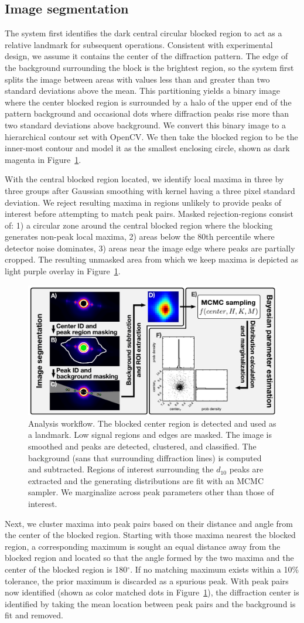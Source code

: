 \documentclass{sig-alternate}
\newcommand{\figureworkflow}{
\begin{figure}[tbp]
  \centering
  \includegraphics[width=\linewidth]{figures/img_analysis}
  \vspace{-8pt}
  \caption{\label{fig:workflow}
  	Analysis workflow.
    The blocked center region is detected and used as a landmark.  Low
    signal regions and edges are masked. The image is smoothed and
    peaks are detected, clustered, and classified. The background
    (sans that surrounding diffraction lines) is computed and
    subtracted. Regions of interest surrounding the $d_{10}$ peaks are
    extracted and the generating distributions are fit with an MCMC
    sampler. We marginalize across peak parameters other than those of
    interest.  
	}
	\vspace{-2pt}
\end{figure}
}
\begin{document}
\subsection{Image segmentation}

The system first identifies the dark central circular blocked region
to act as a relative landmark for subsequent operations. Consistent
with experimental design, we assume it contains the center of the
diffraction pattern. The edge of the background surrounding the block
is the brightest region, so the system first splits the image between
areas with values less than and greater than two standard deviations
above the mean. This partitioning yields a binary image where the
center blocked region is surrounded by a halo of the upper end of the
pattern background and occasional dots where diffraction peaks rise
more than two standard deviations above background. We convert this
binary image to a hierarchical contour set with OpenCV. We then take
the blocked region to be the inner-most contour and model it as the
smallest enclosing circle, shown as dark magenta in
Figure~\ref{fig:workflow}. 

With the central blocked region located, we identify local maxima in
three by three groups after Gaussian smoothing with kernel having a
three pixel standard deviation. We reject resulting maxima in regions
unlikely to provide peaks of interest before attempting to match peak
pairs. Masked rejection-regions consist of: 1) a circular zone around
the central blocked region where the blocking generates non-peak local
maxima, 2) areas below the 80th percentile where detector noise
dominates, 3) areas near the image edge where peaks are partially
cropped. The resulting unmasked area from which we keep maxima is
depicted as light purple overlay in Figure~\ref{fig:workflow}.

\figureworkflow

Next, we cluster maxima into peak pairs based on their distance and
angle from the center of the blocked region. Starting with those
maxima nearest the blocked region, a corresponding maximum is sought
an equal distance away from the blocked region and located so that the
angle formed by the two maxima and the center of the blocked region is
180$^\circ$. If no matching maximum exists within a 10\% tolerance,
the prior maximum is discarded as a spurious peak. With peak pairs now
identified (shown as color matched dots in Figure~\ref{fig:workflow}),
the diffraction center is identified by taking the mean location
between peak pairs and the background is fit and removed. 
\end{document}
